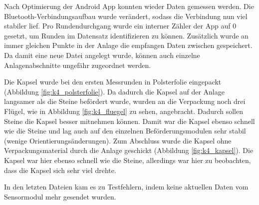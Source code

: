 Nach Optimierung der Android App konnten wieder Daten gemessen werden. Die Bluetooth-Verbindungsaufbau wurde verändert, sodass die Verbindung nun viel stabiler lief. Pro Rundendurchgang wurde ein interner Zähler der App auf 0 gesetzt, um Runden im Datensatz identifizieren zu können. Zusätzlich wurde an immer gleichen Punkte in der Anlage die empfangen Daten zwischen gespeichert. Da damit eine neue Datei angelegt wurde, können auch einzelne Anlagenabschnitte ungefähr zugeordnet werden.

Die Kapsel wurde bei den ersten Messrunden in Polsterfolie eingepackt (Abbildung \ref{fig:k4_polsterfolie}). Da dadurch die Kapsel auf der Anlage langsamer als die Steine befördert wurde, wurden an die Verpackung noch drei Flügel, wie in Abbildung \ref{fig:k4_fluegel} zu sehen, angebracht. Dadurch sollen Steine die Kapsel besser mitnehmen können. Damit war die Kapsel ebenso schnell wie die Steine und lag auch auf den einzelnen Beförderungsmodulen sehr stabil (wenige Orientierungsänderungen). Zum Abschluss wurde die Kapsel ohne Verpackungsmaterial durch die Anlage geschickt (Abbildung \ref{fig:k4_kapsel}). Die Kapsel war hier ebenso schnell wie die Steine, allerdings war hier zu beobachten, dass die Kapsel sich sehr viel drehte. 

In den letzten Dateien kam es zu Testfehlern, indem keine aktuellen Daten vom Sensormodul mehr gesendet wurden.

